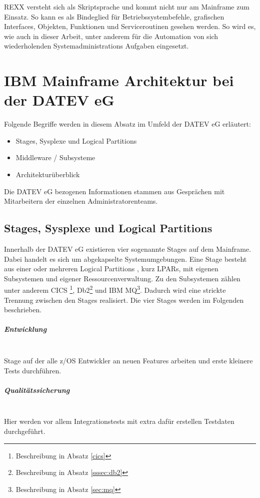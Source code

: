 REXX versteht sich als Skriptsprache und kommt nicht nur am Mainframe zum Einsatz.
So kann es als Bindeglied für Betriebssystembefehle, grafischen Interfaces, Objekten, Funktionen und Serviceroutinen gesehen werden.
So wird es, wie auch in dieser Arbeit, unter anderem für die Automation von sich wiederholenden Systemadministrations Aufgaben eingesetzt.
\cite{Fosdick.2005}

\section{IBM Mainframe Architektur bei der DATEV eG}
Folgende Begriffe werden in diesem Absatz im Umfeld der DATEV eG erläutert:

\begin{samepage}
\begin{itemize}
\item Stages, Sysplexe und Logical Partitions
\item Middleware / Subsysteme
\item Architekturüberblick
\end{itemize}
\end{samepage}

Die DATEV eG bezogenen Informationen stammen aus Gesprächen mit Mitarbeitern der einzelnen Administratorenteams.

\subsection{Stages, Sysplexe und Logical Partitions}\label{sec:sysplex}
Innerhalb der DATEV eG existieren vier sogenannte \glqq Stages\grqq{} auf dem Mainframe.
Dabei handelt es sich um abgekapselte Systemumgebungen.
Eine Stage besteht aus einer oder mehreren \glqq Logical Partitions \grqq, kurz LPARs, mit eigenen Subsystemen und eigener Ressourcenverwaltung. 
Zu den Subsystemen zählen unter anderem CICS \footnote{Beschreibung in Absatz \ref{cics}},  Db2\footnote{Beschreibung in Absatz \ref{sssec:db2}} und IBM MQ\footnote{Beschreibung in Absatz \ref{sec:mq}}.
Dadurch wird eine strickte Trennung zwischen den Stages realisiert.
Die vier Stages werden im Folgenden beschrieben.

\subparagraph{\glqq Entwicklung\grqq}~\\
Stage auf der alle z/OS Entwickler an neuen Features arbeiten und erste kleinere Tests durchführen.

\subparagraph{\glqq Qualitätssicherung\grqq} ~\\
Hier werden vor allem Integrationstests mit extra dafür erstellen Testdaten durchgeführt.

